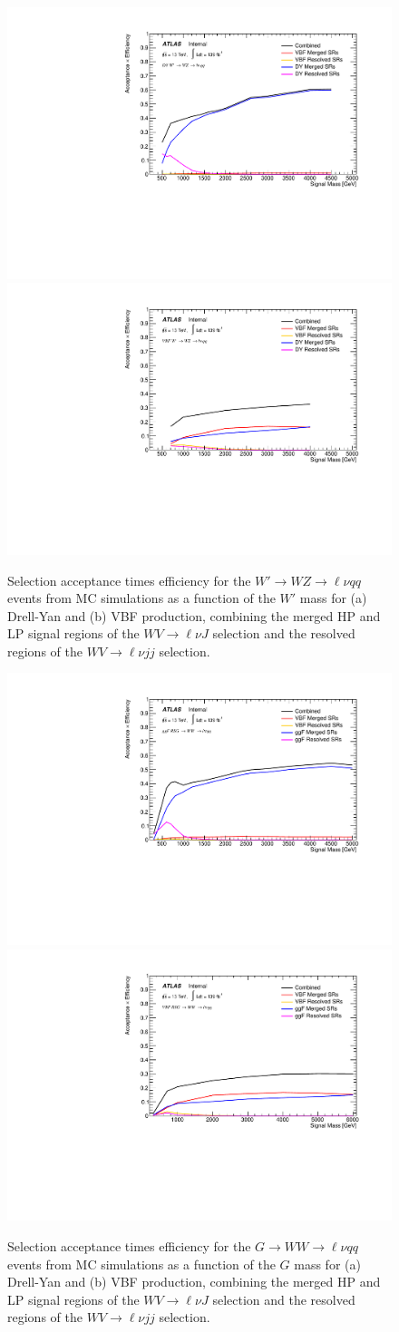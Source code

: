 \begin{figure}[h!]
  \centering
\includegraphics[width=0.48\hsize]{figures/Analysis/signal_acceptance/Acc_times_Eff1lepDYHVT.pdf}
    \includegraphics[width=0.48\hsize]{figures/Analysis/signal_acceptance/Acc_times_Eff1lepVBFHVT.pdf}

      \caption{Selection acceptance times efficiency for the $W'\to WZ\to \ell \nu qq$ events from MC simulations as a function of the $W'$ mass for (a) Drell-Yan and (b) VBF production, combining the merged HP and LP signal regions of the $WV\to \ell\nu J$ selection and the resolved regions of the $WV\to \ell\nu jj$ selection.} 
  \label{fig:accept_hvtww}
\end{figure} 
\FloatBarrier


\begin{figure}[h!]
  \centering
\includegraphics[width=0.48\hsize]{figures/Analysis/signal_acceptance/Acc_times_Eff1lepggFRSG.pdf}
    \includegraphics[width=0.48\hsize]{figures/Analysis/signal_acceptance/Acc_times_Eff1lepVBFRSG.pdf}

      \caption{Selection acceptance times efficiency for the $G\to WW\to \ell \nu qq$ events from MC simulations as a function of the $G$ mass for (a) Drell-Yan and (b) VBF production, combining the merged HP and LP signal regions of the $WV\to \ell\nu J$ selection and the resolved regions of the $WV\to \ell\nu jj$ selection.} 
  \label{fig:accept_hvtww}
\end{figure} 
\FloatBarrier
